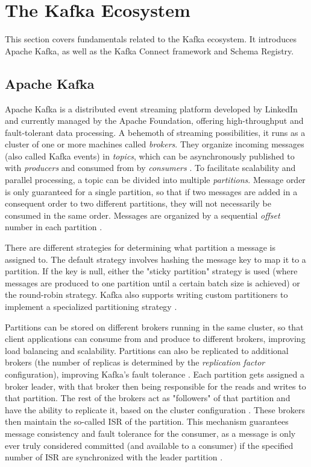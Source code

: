 \section{The Kafka Ecosystem}
\label{ch02:fundamentals:apachekafkaandkafkaconnect}
This section covers fundamentals related to the Kafka ecosystem. It introduces Apache Kafka, as well as the Kafka Connect framework and Schema Registry.
\subsection{Apache Kafka}
\label{ch02:fundamentals:apachekafkaandkafkaconnect:apachekafka}
Apache Kafka is a distributed event streaming platform developed by LinkedIn and currently managed by the Apache Foundation, offering high-throughput and fault-tolerant data processing. A behemoth of streaming possibilities, it runs as a cluster of one or more machines called \textit{brokers}. They organize incoming messages (also called Kafka events) in \textit{topics}, which can be asynchronously published to with \textit{producers} and consumed from by \textit{consumers} \cite{peddireddystreamliningprocessingkafka}. To facilitate scalability and parallel processing, a topic can be divided into multiple \textit{partitions}. Message order is only guaranteed for a single partition, so that if two messages are added in a consequent order to two different partitions, they will not necessarily be consumed in the same order. Messages are organized by a sequential \textit{offset} number in each partition \cite{thein2014apache}.

There are different strategies for determining what partition a message is assigned to. The default strategy involves hashing the message key to map it to a partition. If the key is null, either the "sticky partition" strategy is used (where messages are produced to one partition until a certain batch size is achieved) or the round-robin strategy. Kafka also supports writing custom partitioners to implement a specialized partitioning strategy  \cite{kafkadocumentation}.

Partitions can be stored on different brokers running in the same cluster, so that client applications can consume from and produce to different brokers, improving load balancing and scalability. Partitions can also be replicated to additional brokers (the number of replicas is determined by the \textit{replication factor} configuration), improving Kafka's fault tolerance \cite{thein2014apache}. Each partition gets assigned a broker leader, with that broker then being responsible for the reads and writes to that partition. The rest of the brokers act as "followers" of that partition and have the ability to replicate it, based on the cluster configuration \cite{petrescukafkaraft}. These brokers then maintain the so-called \ac{ISR} of the partition. This mechanism guarantees message consistency and fault tolerance for the consumer, as a message is only ever truly considered committed (and available to a consumer) if the specified number of \ac{ISR} are synchronized with the leader partition \cite{kafkadocumentation}.

